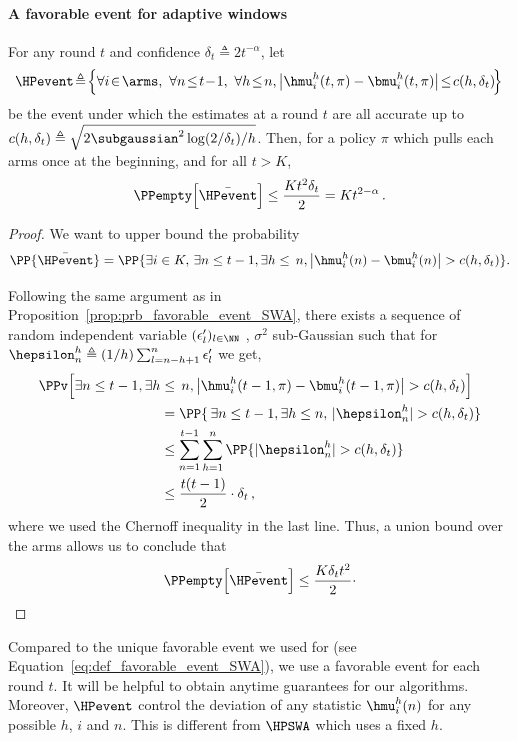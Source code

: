 \paragraph{A favorable event for adaptive windows}
\begin{proposition}
\label{prop:prb_favorable_event}
For any round $t$ and confidence $\delta_{t} \triangleq 2t^{-\alpha}$, let 
%
\begin{equation}
\!\HPevent\! \triangleq\! \Big\{ \forall i\!\in\!\arms,\ \forall n \!\leq\! t\!-\!1 ,\ \forall h \!\leq\! n, \big| \hmu^h_i(t, \pi) - \bmu^h_i(t,\pi) \big| \!\leq\! c(h, \delta_{t}) \!\Big\}
\label{eq:def_favorable_event}
\end{equation}
 be the event under which the estimates at a round $t$  are all accurate up to $c(h,\delta_{t}) \triangleq \sqrt{2 \subgaussian^2\log(2/\delta_t)/h}$. Then, for a policy $\pi$ which pulls each arms once at the beginning, and for all $t>K$,
\[
\PPempty\Big[\bar{\HPevent}\Big] \leq \frac{Kt^2\delta_{t}}{2}=Kt^{2-\alpha}\,.
\]
\end{proposition} 

\begin{proof}
We want to upper bound the probability
\[
\PP{\bar{\HPevent}} = \PP{\exists i \in K,\,\exists n \leq t-1, \exists h \leq\, n, \big|\hmu^h_i(n)-\bmu^h_i(n)\big|>c(h,\delta_t) }.
\]

Following the same argument as in Proposition~\ref{prop:prb_favorable_event_SWA}, there exists a sequence of random independent variable $(\epsilon'_l)_{l\in\NN}$ , $\sigma^2$ sub-Gaussian such that for $\hepsilon^h_n \triangleq (1/h) \sum_{l=n-h+1}^n \epsilon'_l$ we get, 
\begin{align*}
    \PPv\Big[\exists n \leq t-1, \exists h &\leq\, n, \big|\hmu^h_i(t-1,\pi)-\bmu^h_i(t-1,\pi)\big|>c(h,\delta_t) \Big]\\
    &= \PP{\,\exists n \leq t-1, \exists h \leq n,\, |\hepsilon^h_n|>c(h,\delta_t) }\\
    &\leq \sum_{n=1}^{t-1}\sum_{h=1}^n \PP{|\hepsilon^h_n|>c(h,\delta_t)} \\
    &\leq  \frac{t(t-1)}{2}\cdot \delta_t \,,
\end{align*}
where we used the Chernoff inequality in the last line. Thus, a union bound  over the arms allows us to conclude that
\[
\PPempty \Big[\bar{\HPevent}\Big]\leq \frac{K \delta_t t^2}{2}\cdot
\]
\end{proof}
\begin{remark}
Compared to the unique favorable event we used for \SWA (see Equation~\ref{eq:def_favorable_event_SWA}), we use a favorable event for each round $t$. It will be helpful to obtain anytime guarantees for our algorithms. Moreover, $\HPevent$ control the deviation of any statistic $\hmu_i^h(n)$ for any possible $h$, $i$ and $n$. This is different from $\HPSWA$ which uses a fixed $h$. 
\end{remark}

